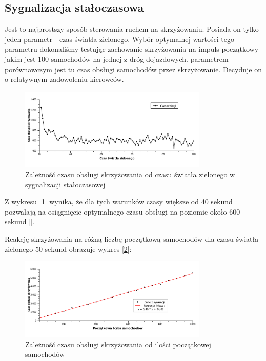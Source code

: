 \documentclass[11pt]{aghdpl}
\begin{document}
\subsection{Sygnalizacja stałoczasowa}
Jest to najprostszy sposób sterowania ruchem na skrzyżowaniu. Posiada on tylko jeden parametr - czas światła zielonego. 
Wybór optymalnej wartości tego parametru dokonaliśmy testując zachowanie skrzyżowania na impuls początkowy jakim jest 100 samochodów na jednej z dróg dojazdowych. parametrem porównawczym jest tu czas obsługi samochodów przez skrzyżowanie. Decyduje on o relatywnym zadowoleniu kierowców.
\begin{figure}[h!]
	\centering
	\includegraphics[width=0.80\textwidth]{czasobs(time).pdf}
	\caption{Zależność czasu obsługi skrzyżowania od czasu światła zielonego w sygnalizacji stałoczasowej}	
	\label{czasobs(time)}
\end{figure}

Z wykresu [\ref{czasobs(time)}] wynika, że dla tych warunków czasy większe od 40 sekund pozwalają na osiągnięcie optymalnego czasu obsługi na poziomie około 600 sekund [\label{600}]. 

Reakcję skrzyżowania na różną liczbę początkową samochodów dla czasu światła zielonego 50 sekund obrazuje wykres [\ref{czasobs(ilosc)}]:

\begin{figure}[h!]
	\centering
	\includegraphics[width=0.80\textwidth]{czasobs(ilosc).pdf}
	\caption{Zależność czasu obsługi skrzyżowania od ilości początkowej samochodów}	
	\label{czasobs(ilosc)}
\end{figure} 
\end{document}
